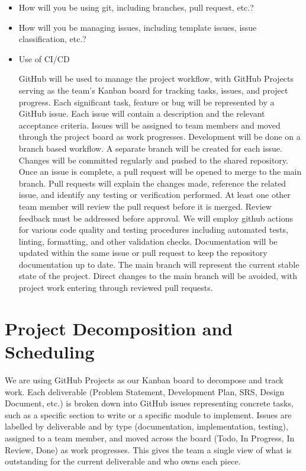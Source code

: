 \documentclass{article}
\begin{document}
\begin{itemize}
	\item How will you be using git, including branches, pull request, etc.?
	\item How will you be managing issues, including template issues, issue
	classification, etc.?
  \item Use of CI/CD

GitHub will be used to manage the project workflow, with GitHub Projects serving as the team’s Kanban board for tracking tasks, issues, and project progress.
Each significant task, feature or bug will be represented by a GitHub issue. Each issue will  contain a description and the relevant acceptance criteria. Issues will be assigned to team members and moved through the project board as work progresses.
Development will be done on a branch based workflow. A separate branch will be created for each issue. Changes will be committed regularly and pushed to the shared repository.
Once an issue is complete, a pull request will be opened to merge to the main branch. Pull requests will explain the changes made, reference the related issue, and identify any testing or verification performed. At least one other team member will review the pull request before it is merged. Review feedback must be addressed before approval.
We will employ github actions for various code quality and testing procedures including automated tests, linting, formatting, and other validation checks. Documentation will be updated within the same issue or pull request to keep the repository documentation up to date.
The main branch will represent the current stable state of the project. Direct changes to the main branch will be avoided, with project work entering through reviewed pull requests. 

\end{itemize}

\section{Project Decomposition and Scheduling}

We are using GitHub Projects as our Kanban board to decompose and track work.
Each deliverable (Problem Statement, Development Plan, SRS, Design Document,
etc.) is broken down into GitHub issues representing concrete tasks, such as a
specific section to write or a specific module to implement. Issues are
labelled by deliverable and by type (documentation, implementation, testing),
assigned to a team member, and moved across the board (Todo, In Progress, In
Review, Done) as work progresses. This gives the team a single view of what is
outstanding for the current deliverable and who owns each piece.
\end{document}
